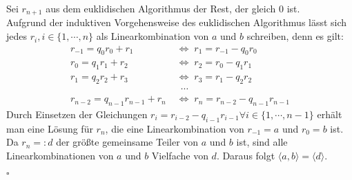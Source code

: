 \documentclass[12pt]{article}
\newcommand{\QED}{\begin{flushright} $\square$ \end{flushright}}
\newcommand{\ideal}[1]{\langle#1\rangle}
\newcommand{\gdw}{\;\Longleftrightarrow\;}
\begin{document}
\begin{enumerate}
	Sei $r_{n+1}$ aus dem euklidischen Algorithmus der Rest, der gleich $0$ ist. \\
	Aufgrund der induktiven Vorgehensweise des euklidischen Algorithmus lässt sich jedes $r_i, i\in\{1,\cdots,n\}$ als Linearkombination von $a$ und $b$ schreiben, denn es gilt:
	\begin{align*}
		r_{-1}=q_{0}r_{0}+r_{1} &\gdw r_{1}=r_{-1}-q_{0}r_{0} \\
		r_{0}=q_{1}r_{1}+r_{2} &\gdw r_{2}=r_{0}-q_{1}r_{1} \\
		r_{1}=q_{2}r_{2}+r_{3} &\gdw r_{3}=r_{1}-q_{2}r_{2} \\
		&\;\;\,\cdots  \\
		r_{n-2}=q_{n-1}r_{n-1}+r_{n} &\gdw r_{n}=r_{n-2}-q_{n-1}r_{n-1}
	\end{align*}
	Durch Einsetzen der Gleichungen $r_i=r_{i-2}-q_{i-1}r_{i-1}\forall i\in\{1,\cdots,n-1\}$ erhält man eine Lösung für $r_n$, die eine Linearkombination von $r_{-1}=a$ und $r_0=b$ ist. \\
	Da $r_n=:d$ der größte gemeinsame Teiler von $a$ und $b$ ist, sind alle Linearkombinationen von $a$ und $b$ Vielfache von $d$. Daraus folgt $\ideal{a,b}=\ideal{d}$.
	\QED
	
\end{enumerate}
\end{document}

